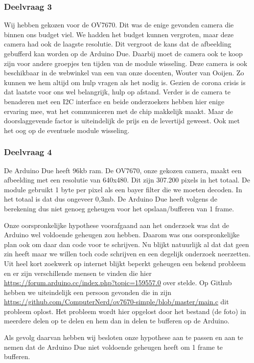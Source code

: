 \documentclass{article}
\begin{document}
\subsubsection{Deelvraag 3}
Wij hebben gekozen voor de OV7670. Dit was de enige gevonden camera die binnen ons budget viel. We hadden het budget kunnen vergroten, maar deze camera had ook de laagste resolutie. Dit vergroot de kans dat de afbeelding gebufferd kan worden op de Arduino Due. Daarbij moet de camera ook te koop zijn voor andere groepjes ten tijden van de module wisseling.  Deze camera is ook beschikbaar in de webwinkel van een van onze docenten, Wouter van Ooijen. Zo kunnen we hem altijd om hulp vragen als het nodig is. Gezien de corona crisis is dat laatste voor ons wel belangrijk, hulp op afstand. Verder is de camera te benaderen met een I2C interface en beide onderzoekers hebben hier enige ervaring mee, wat het communiceren met de chip makkelijk maakt. Maar de doorslaggevende factor is uiteindelijk de prijs en de levertijd geweest. Ook met het oog op de eventuele module wisseling.

\subsubsection{Deelvraag 4}
De Arduino Due heeft 96kb ram. De OV7670, onze gekozen camera, maakt een afbeelding met een resolutie van 640x480. Dit zijn 307.200 pixels in het totaal. De module gebruikt 1 byte per pixel als een bayer filter die we moeten decoden. In het totaal is dat dus ongeveer 0,3mb. De Arduino Due heeft volgens de berekening dus niet genoeg geheugen voor het opslaan/bufferen van 1 frame.

Onze oorspronkelijke hypothese voorafgaand aan het onderzoek was dat de Arduino wel voldoende geheugen zou hebben. Daarom was ons oorspronkelijke plan ook om daar dan code voor te schrijven. Nu blijkt natuurlijk al dat dat geen zin heeft maar we willen toch code schrijven en een degelijk onderzoek neerzetten.
Uit heel kort zoekwerk op internet blijkt beperkt geheugen een bekend probleem en er zijn verschillende mensen te vinden die hier \href{vragen}{https://forum.arduino.cc/index.php?topic=159557.0} over stelde. Op Github hebben we uiteindelijk een persoon gevonden die in zijn \href{main}{https://github.com/ComputerNerd/ov7670-simple/blob/master/main.c} dit probleem oplost. Het probleem wordt hier opgelost door het bestand (de foto) in meerdere delen op te delen en hem dan in delen te bufferen op de Arduino. 

Als gevolg daarvan hebben wij besloten onze hypothese aan te passen en aan te nemen dat de Arduino Due niet voldoende geheugen heeft om 1 frame te bufferen.
\end{document}
